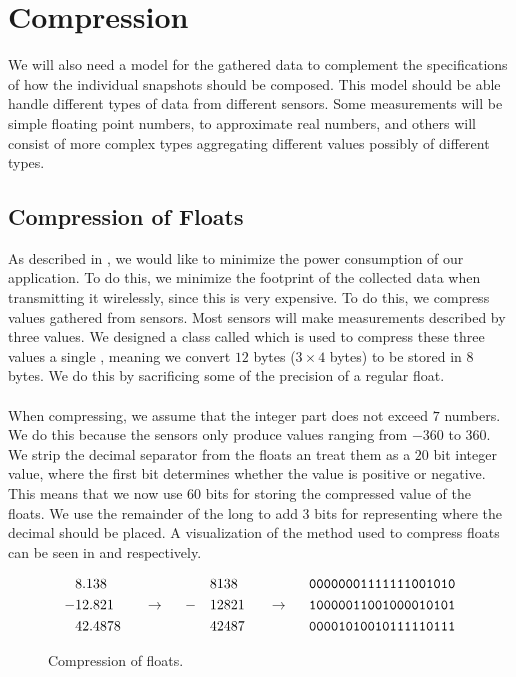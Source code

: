 
\section{Compression}
We will also need a model for the gathered data to complement the specifications of how the individual snapshots should be composed. This model should be able handle different types of data from different sensors. Some measurements will be simple floating point numbers, to approximate real numbers, and others will consist of more complex types aggregating different values possibly of different types.



\subsection{Compression of Floats}
As described in , we would like to minimize the power consumption of our application. To do this, we minimize the footprint of the collected data when transmitting it wirelessly, since this is very expensive. To do this, we compress values gathered from sensors. Most sensors will make measurements described by three  values. We designed a class called  which is used to compress these three values a single , meaning we convert $12$ bytes ($3 \times 4$ bytes) to be stored in $8$ bytes. We do this by sacrificing some of the precision of a regular float.
\\\\
When compressing, we assume that the integer part does not exceed $7$ numbers. We do this because the sensors only produce values ranging from $-360$ to $360$. We strip the decimal separator from the floats an treat them as a $20$ bit integer value, where the first bit determines whether the value is positive or negative. This means that we now use $60$ bits for storing the compressed value of the floats. We use the remainder of the long to add 3 bits for representing where the decimal should be placed. A visualization of the method used to compress floats can be seen in  and  respectively.
\begin{figure}[!htbp]
    \begin{alignat*}{6}
       &8.138   &&                   &&   && 8138  &&                   && \text{\texttt{00000001111111001010}} \\
      -&12.821  && ~~ \rightarrow ~~ && - && 12821 && ~~ \rightarrow ~~ && \text{\texttt{10000011001000010101}} \\
       &42.4878 &&                   &&   && 42487 &&                   && \text{\texttt{00001010010111110111}} 
    \end{alignat*}
    \caption{Compression of floats.}
    \label{fig:float_triple_convert}
\end{figure}


